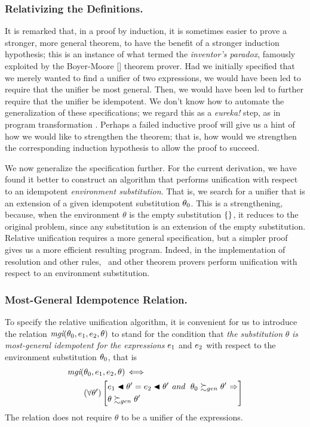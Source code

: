 \documentclass[runningheads]{llncs}
\DeclareMathOperator{\uand}{\emph{and}\,}
\DeclareMathOperator{\uimplies}{\Rightarrow}
\DeclareMathOperator{\uiff}{\iff}
\DeclareMathOperator{\mgi}{\emph{mgi}}
\begin{document}
\subsubsection{Relativizing the Definitions.} 
It is remarked that, in a proof by induction, it is sometimes easier to prove a stronger, more general theorem, to have the benefit of a stronger induction hypothesis; this is an instance of what \citet{pol}  termed the \emph{inventor's paradox}, famously exploited by the Boyer-Moore [\citeyear{boy:moo}] theorem prover.  Had we initially specified that we merely wanted to find a unifier of two expressions, we would have been led to require that the unifier be most general.  Then, we would have been led to further require that the unifier be idempotent. We don't know how to automate the generalization of these specifications; we regard this as a \emph{eureka!} step, as in program transformation \citep{bur:dar}. Perhaps a failed inductive proof will give us a hint of how we would like to strengthen the theorem; that is, how would we strengthen the corresponding induction hypothesis to allow the proof to succeed.


We now generalize the specification further. For the current derivation, we have found it better to construct an algorithm that performs unification with respect to an idempotent \emph{environment substitution}.  That is, we search for a unifier that is an extension of a given idempotent substitution $\theta_{0}$. This is a strengthening, because, when the environment $\theta$ is the empty substitution $\{\}$, it reduces to the original problem, since any substitution is an extension of the empty substitution.  Relative unification requires a more general specification, but a simpler proof gives us a more efficient resulting program.  Indeed, in the implementation of resolution and other rules,  \SNARK\ and other theorem provers perform unification with respect to an environment substitution.


\subsubsection{Most-General Idempotence Relation.}  To specify the relative unification algorithm, it is convenient for us to introduce the relation  ${\mgi} (\thet{0},  \e{1}, \e{2}, \theta)$  to stand for the condition that \emph{the substitution} $\theta$ \emph{is most-general idempotent for the expressions} $e_{1}$ and $e_{2}$ with respect to the environment substitution $\theta_{0}$, that is
\begin{align*}
 {\mgi}(&\thet{0}, \e{1}, \e{2}, \theta) \uiff \\
&\begin{aligned}
 (\forall \theta') \left[{
 \begin {aligned} &\e{1} \apply \theta' = \e{2} \apply \theta' \, \uand \,  
  \,\thet{0} \moregen \theta' \,\uimplies\\
                    &\theta \moregen \theta'
   \end{aligned}}
   \right] \end{aligned}
   \end{align*}
The relation does not require $\theta$ to be a unifier of the expressions.
\end{document}
